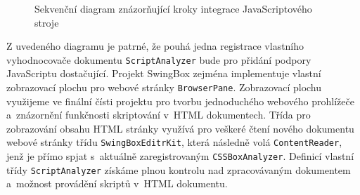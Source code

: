 \begin{figure}[H]
  \begin{center}
    \caption{Sekvenční diagram znázorňující kroky integrace JavaScriptového stroje}
    \label{Figure.SwingBoxIntegrationDesign}
  \end{center}
\end{figure}

Z uvedeného diagramu je patrné, že pouhá jedna registrace vlastního vyhodnocovače dokumentu \texttt{ScriptAnalyzer} bude pro přidání podpory JavaScriptu dostačující. Projekt SwingBox zejména implementuje vlastní zobrazovací plochu pro webové stránky \texttt{BrowserPane}. Zobrazovací plochu využijeme ve finální čísti projektu pro tvorbu jednoduchého webového prohlížeče a~znázornění funkčnosti skriptování v~HTML dokumentech. Třída pro zobrazování obsahu HTML stránky využívá pro veškeré čtení nového dokumentu webové stránky třídu \texttt{SwingBoxEditrKit}, která následně volá \texttt{ContentReader}, jenž je přímo spjat s~aktuálně zaregistrovaným \texttt{CSSBoxAnalyzer}. Definicí vlastní třídy \texttt{ScriptAnalyzer} získáme plnou kontrolu nad zpracovávaným dokumentem a~možnost provádění skriptů v~HTML dokumentu. 

